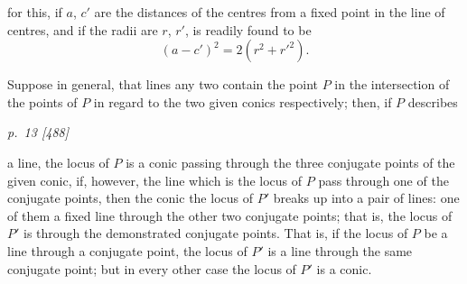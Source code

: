 \documentclass[11pt,a4paper]{article}
\theoremstyle{plain}
\theoremstyle{definition}
\begin{document}
\begin{center}
\end{center}

for this, if $a$, $c'$ are the distances of the centres from a fixed point in the line of
centres, and if the radii are $r$, $r'$, is readily found to be
\[
(a - c')^2 = 2 (r^2 + r'^2).
\]

Suppose in general, that lines any two contain the point $P$ in the intersection
of the points of $P$ in regard to the two given conics respectively; then, if $P$ describes

\clearpage

\bigskip
\textit{p.~13 [488]}
\smallskip

\noindent
a line, the locus of $P$ is a conic passing through the three conjugate points of the
given conic, if, however, the line which is the locus of $P$ pass through one of the
conjugate points, then the conic the locus of $P'$ breaks up into a pair of lines: one of
them a fixed line through the other two conjugate points; that is, the locus of $P'$ is
through the demonstrated conjugate points.  That is, if the locus of $P$ be a line
through a conjugate point, the locus of $P'$ is a line through the same conjugate
point; but in every other case the locus of $P'$ is a conic.
\end{document}
